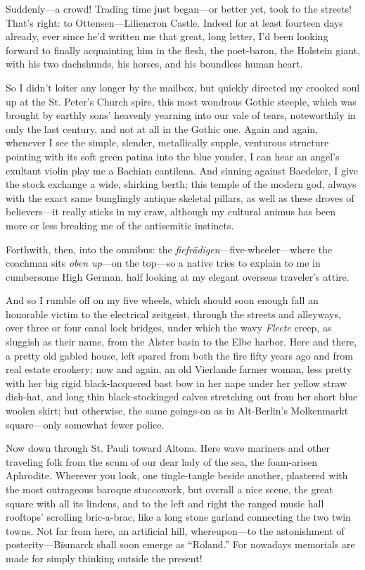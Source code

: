 \documentclass[12pt,a4paper]{article}
\begin{document}
Suddenly—a crowd! Trading time just began—or better yet, took to the streets! That’s right: to Ottensen—Liliencron Castle. Indeed for at least fourteen days already, ever since he’d written me that great, long letter, I’d been looking forward to finally acquainting him in the flesh, the poet-baron, the Holstein giant, with his two dachshunds, his horses, and his boundless human heart.

So I didn’t loiter any longer by the mailbox, but quickly directed my crooked soul up at the St. Peter’s Church spire, this most wondrous Gothic steeple, which was brought by earthly sons’ heavenly yearning into our vale of tears, noteworthily in only the last century, and not at all in the Gothic one. Again and again, whenever I see the simple, slender, metallically supple, venturous structure pointing with its soft green patina into the blue yonder, I can hear an angel’s exultant violin play me a Bachian cantilena. And sinning against Baedeker, I give the stock exchange a wide, shirking berth; this temple of the modern god, always with the exact same bunglingly antique skeletal pillars, as well as these droves of believers—it really sticks in my craw, although my cultural animus has been more or less breaking me of the antisemitic instincts.

Forthwith, then, into the omnibus: the \textit{fiefrädigen}—five-wheeler—where the coachman sits \textit{oben up}—on the top—so a native tries to explain to me in cumbersome High German, half looking at my elegant overseas traveler’s attire.

And so I rumble off on my five wheels, which should soon enough fall an honorable victim to the electrical zeitgeist, through the streets and alleyways, over three or four canal lock bridges, under which the wavy \textit{Fleete} creep, as sluggish as their name, from the Alster basin to the Elbe harbor. Here and there, a pretty old gabled house, left spared from both the fire fifty years ago and from real estate crookery; now and again, an old Vierlande farmer woman, less pretty with her big rigid black-lacquered bast bow in her nape under her yellow straw dish-hat, and long thin black-stockinged calves stretching out from her short blue woolen skirt; but otherwise, the same goings-on as in Alt-Berlin’s Molkenmarkt square—only somewhat fewer police.

Now down through St. Pauli toward Altona. Here wave mariners and other traveling folk from the scum of our dear lady of the sea, the foam-arisen Aphrodite. Wherever you look, one tingle-tangle beside another, plastered with the most outrageous baroque stuccowork, but overall a nice scene, the great square with all its lindens, and to the left and right the ranged music hall rooftops’ scrolling bric-a-brac, like a long stone garland connecting the two twin towns. Not far from here, an artificial hill, whereupon—to the astonishment of posterity—Bismarck shall soon emerge as “Roland.” For nowadays memorials are made for simply thinking outside the present!
\end{document}
